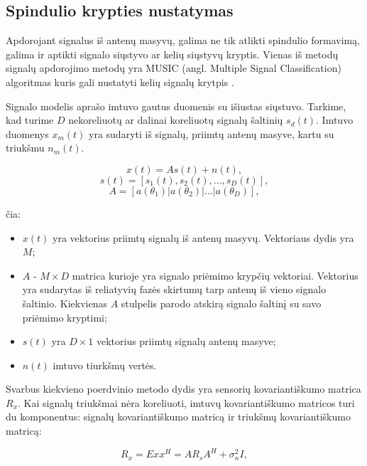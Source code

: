 \documentclass[main.tex]{subfiles}
\begin{document}
\subsection{Spindulio krypties nustatymas}\label{sec:music}

Apdorojant signalus iš antenų masyvų, galima ne tik atlikti spindulio
formavimą, galima ir aptikti signalo siųstyvo ar kelių siųstyvų kryptis.
Vienas iš metodų signalų apdorojimo metodų yra MUSIC (angl. Multiple Signal Classification)
algoritmas kuris gali nustatyti kelių signalų krytpis \cite{1143830}.

Signalo modelis aprašo imtuvo gautus duomenis su išiustas siųstuvo. Tarkime, kad
turime $D$ nekoreliuotų ar dalinai koreliuotų signalų šaltinių $s_d(t)$. Imtuvo
duomenys $x_m(t)$ yra sudaryti iš signalų, priimtų antenų masyve, kartu su triukšmu
$n_m(t)$.

\begin{equation}
    x(t) = As(t) + n(t),
\end{equation}
\begin{equation}
    s(t) = [s_1(t), s_2(t),...,s_D(t)],
\end{equation}
\begin{equation}
    A = [a(\theta_1) | a(\theta_2) | ... | a(\theta_D)],
\end{equation}

\noindent čia:

\begin{itemize}
    \item $x(t)$ yra vektorius priimtų signalų iš antenų masyvų. Vektoriaus dydis yra $M$;
    \item $A$ - $M\times D$ matrica kurioje yra signalo priėmimo krypčių vektoriai. Vektorius
    yra sudarytas iš reliatyvių fazės skirtumų tarp antenų iš vieno signalo šaltinio. Kiekvienas
    $A$ stulpelis parodo atskirą signalo šaltinį su savo priėmimo kryptimi;
    \item $s(t)$ yra $D\times 1$ vektorius priimtų signalų antenų masyve;
    \item $n(t)$ imtuvo tiurkšmų vertės.
\end{itemize}

Svarbus kiekvieno poerdvinio metodo dydis yra sensorių kovariantiškumo matrica $R_x$.
Kai signalų triukšmai nėra koreliuoti, imtuvų kovariantiškumo matricos turi du komponentus:
signalų kovariantiškumo matricą ir triukšmų kovariantiškumo matricą:

\begin{equation}
    R_x = E{xx^H} = AR_sA^H + \sigma^2_n I,
\end{equation}
\end{document}
